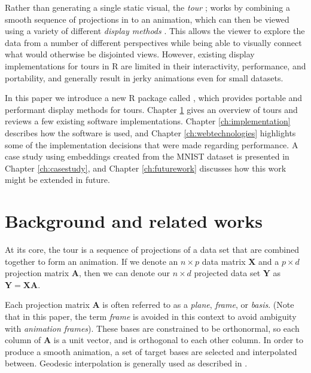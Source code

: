 Rather than generating a single static visual, the \emph{tour}
\citep{asimov1985grand}; \citep{buja2005computational} works by
combining a smooth sequence of projections in to an animation, which can
then be viewed using a variety of different \emph{display methods}
\citep{wickham2011tourr}. This allows the viewer to explore the data
from a number of different perspectives while being able to visually
connect what would otherwise be disjointed views. However, existing
display implementations for tours in R are limited in their
interactivity, performance, and portability, and generally result in
jerky animations even for small datasets.

In this paper we introduce a new R package called ,
which provides portable and performant display methods for tours.
Chapter \ref{ch:litreview} gives an overview of tours and reviews a few
existing software implementations. Chapter \ref{ch:implementation}
describes how the software is used, and Chapter \ref{ch:webtechnologies}
highlights some of the implementation decisions that were made regarding
performance. A case study using embeddings created from the MNIST
\citep{lecun1998mnist} dataset is presented in Chapter
\ref{ch:casestudy}, and Chapter \ref{ch:futurework} discusses how this
work might be extended in future.

\pagebreak

\hypertarget{ch:litreview}{%
\section{Background and related works}\label{ch:litreview}}

At its core, the tour is a sequence of projections of a data set that
are combined together to form an animation. If we denote an
\(n \times p\) data matrix \(\mathbf X\) and a \(p \times d\) projection
matrix \(\mathbf A\), then we can denote our \(n \times d\) projected
data set \(\mathbf Y\) as \(\mathbf Y = \mathbf X \mathbf A\).

Each projection matrix \(\mathbf A\) is often referred to as a
\emph{plane}, \emph{frame}, or \emph{basis}. (Note that in this paper,
the term \emph{frame} is avoided in this context to avoid ambiguity with
\emph{animation frames}). These bases are constrained to be orthonormal,
so each column of \(\mathbf A\) is a unit vector, and is orthogonal to
each other column. In order to produce a smooth animation, a set of
target bases are selected and interpolated between. Geodesic
interpolation is generally used as described in
\citep{buja2005computational}.

